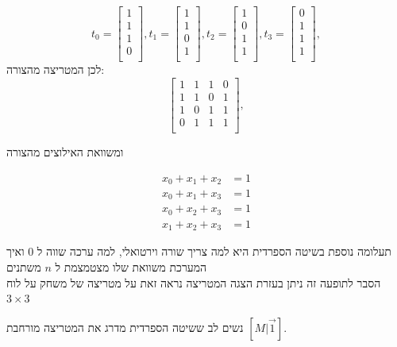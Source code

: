 \documentclass[12pt,twoside]{article}
\begin{document}
\[
   t_0 = 
    \begin{bmatrix}
        1 \\
        1 \\
        1 \\
        0 \\
    \end{bmatrix},
    t_1 = 
    \begin{bmatrix}
        1 \\
        1 \\
        0 \\
        1 \\
    \end{bmatrix},
    t_2 = 
    \begin{bmatrix}
        1 \\
        0 \\
        1 \\
        1 \\
    \end{bmatrix},
    t_3 = 
    \begin{bmatrix}
        0 \\
        1 \\
        1 \\
        1 \\
    \end{bmatrix},
\]
לכן
המטריצה מהצורה:
\[
    \begin{bmatrix}
        1 & 1 & 1 &0 \\
        1 & 1 & 0 & 1 \\
        1 & 0 & 1 & 1 \\
        0 & 1 & 1 & 1 \\
    \end{bmatrix},
\]

ומשוואת האילוצים
מהצורה 

\begin{align*}
    x_0 + x_1 + x_2 &= 1\\
    x_0 + x_1 + x_3 &= 1\\
    x_0 + x_2 + x_3 &= 1\\
    x_1 + x_2 + x_3 &= 1
\end{align*}

תעלומה נוספת בשיטה הספרדית היא למה צריך שורה וירטואלי, למה ערכה 
שווה ל
$0$
ואיך המערכת משוואת שלו מצטמצמת ל
$n$
משתנים
\\
הסבר לתופעה זה
ניתן בעזרת הצגה המטריצה
נראה זאת על מטריצה 
של משחק 
על לוח 
$3 \times 3$

נשים לב ששיטה הספרדית מדרג את המטריצה מורחבת 
$[M | \vec{1}]$.
\end{document}
